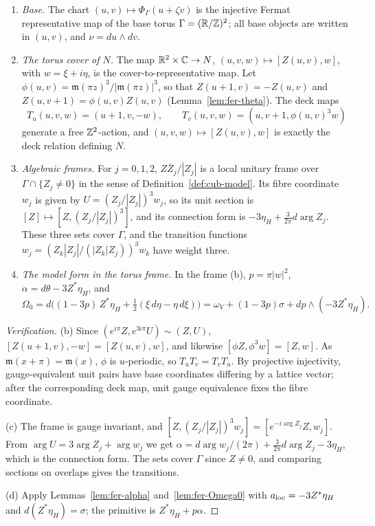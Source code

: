 \begin{construction}\label{cons:fer-atlas}
\begin{enumerate}[label=(\alph*)]
\item \emph{Base.} The chart $(u,v)\mapsto\Phi_\Gamma(u+\zeta v)$ is the injective Fermat representative map of the base torus $\Gamma=(\mathbb{R}/\mathbb{Z})^2$; all base objects are written in $(u,v)$, and $\nu=du\wedge dv$.
\item \emph{The torus cover of $N$.} The map $\mathbb{R}^2\times\mathbb{C}\to N$, $(u,v,w)\mapsto[Z(u,v),w]$, with $w=\xi+i\eta$, is the cover-to-representative map. Let $\phi(u,v)=\mathfrak m(\pi z)^3/|\mathfrak m(\pi z)|^3$, so that $Z(u+1,v)=-Z(u,v)$
and $Z(u,v+1)=\phi(u,v)Z(u,v)$ (Lemma~\ref{lem:fer-theta}). The deck maps
\[
 T_u(u,v,w)=(u+1,v,-w),\qquad T_v(u,v,w)=(u,v+1,\phi(u,v)^3w)
\]
generate a free $\mathbb{Z}^2$-action, and $(u,v,w)\mapsto[Z(u,v),w]$ is exactly the deck relation defining $N$.
\item \emph{Algebraic frames.} For $j=0,1,2$, $Z\bar Z_j/|Z_j|$ is a local unitary frame over $\Gamma\cap\{Z_j\ne0\}$ in the sense
of Definition~\ref{def:cub-model}. Its fibre coordinate $w_j$ is given by $U=(Z_j/|Z_j|)^3w_j$, so its unit section is
$[Z]\mapsto[Z,(Z_j/|Z_j|)^3]$, and its connection form is $-3\eta_H+\frac3{2\pi}d\arg Z_j$. These three sets cover $\Gamma$, and the
transition functions $w_j=(Z_k|Z_j|/(|Z_k|Z_j))^3w_k$ have weight three.
\item \emph{The model form in the torus frame.} In the frame (b), $p=\pi|w|^2$, $\alpha=d\theta-3Z^*\eta_H$, and
\[
 \Omega_0=d\Big((1-3p)\,Z^*\eta_H+\tfrac12(\xi\,d\eta-\eta\,d\xi)\Big)=\omega_V+(1-3p)\sigma+dp\wedge(-3Z^*\eta_H).
\]
\end{enumerate}
\end{construction}

\begin{proof}[Verification]
(b) Since $(e^{i\pi}Z,e^{3i\pi}U)\sim(Z,U)$, $[Z(u+1,v),-w]=[Z(u,v),w]$, and likewise $[\phi Z,\phi^3w]=[Z,w]$. As $\mathfrak m(x+\pi)=\mathfrak m(x)$, $\phi$ is $u$-periodic, so $T_uT_v=T_vT_u$. By projective injectivity, gauge-equivalent unit pairs have base coordinates differing by a lattice vector; after the corresponding deck map, unit gauge equivalence fixes the fibre coordinate.

(c) The frame is gauge invariant, and $[Z,(Z_j/|Z_j|)^3w_j]=[e^{-i\arg Z_j}Z,w_j]$. From $\arg U=3\arg Z_j+\arg w_j$ we get $\alpha=d\arg w_j/(2\pi)+\frac3{2\pi}d\arg Z_j-3\eta_H$, which is the connection form. The sets cover $\Gamma$ since $Z\ne0$, and comparing sections on overlaps gives the transitions.

(d) Apply Lemmas~\ref{lem:fer-alpha} and~\ref{lem:fer-Omega0} with $a_{\rm loc}=-3Z^*\eta_H$ and $d(Z^*\eta_H)=\sigma$; the primitive is $Z^*\eta_H+p\alpha$.
\end{proof}

